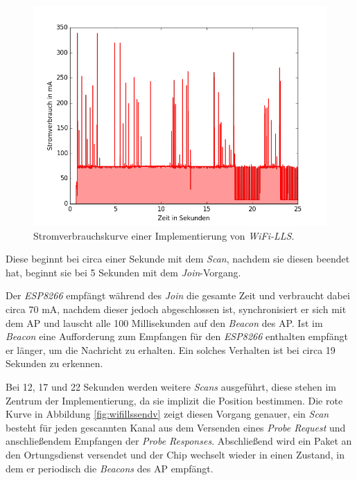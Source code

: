 \begin{figure}[h!]
  \centering
	\includegraphics[width=\textwidth]{plots/wifills.png}
  \caption{Stromverbrauchskurve einer Implementierung von \emph{WiFi-LLS}.}
  \label{fig:wifills}
\end{figure}

Diese beginnt bei circa einer Sekunde mit dem \emph{Scan}, nachdem sie diesen beendet hat, beginnt sie bei 5 Sekunden mit dem \emph{Join}-Vorgang.

Der \emph{ESP8266} empfängt während des \emph{Join} die gesamte Zeit und verbraucht dabei circa 70 mA, nachdem dieser jedoch abgeschlossen ist, synchronisiert er sich mit dem AP und lauscht alle 100 Millisekunden auf den \emph{Beacon} des AP.
Ist im \emph{Beacon} eine Aufforderung zum Empfangen für den \emph{ESP8266} enthalten empfängt er länger, um die Nachricht zu erhalten.
Ein solches Verhalten ist bei circa 19 Sekunden zu erkennen.

Bei 12, 17 und 22 Sekunden werden weitere \emph{Scans} ausgeführt, diese stehen im Zentrum der Implementierung, da sie implizit die Position bestimmen.
Die rote Kurve in Abbildung \ref{fig:wifillssendv} zeigt diesen Vorgang genauer, ein \emph{Scan} besteht für jeden gescannten Kanal aus dem Versenden eines \emph{Probe Request} und anschließendem Empfangen der \emph{Probe Responses}. 
Abschließend wird ein Paket an den Ortungsdienst versendet und der Chip wechselt wieder in einen Zustand, in dem er periodisch die \emph{Beacons} des AP empfängt.

